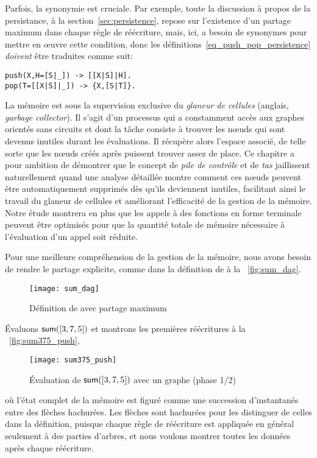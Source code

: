 Parfois, la synonymie est cruciale. Par exemple, toute la discussion à
propos de la persistance, à la section~\ref{sec:persistence}, repose
sur l'existence d'un partage maximum dans chaque règle de réécriture,
mais, ici, \Erlang a besoin de synonymes pour mettre en {\oe}uvre
cette condition, donc les définitions~\eqref{eq_push_pop_persistence}
 \emph{doivent} être traduites comme
suit:
\begin{verbatim}
push(X,H=[S|_]) -> [[X|S]|H].
pop(T=[[X|S]|_]) -> {X,[S|T]}.
\end{verbatim}


La mémoire est sous la supervision exclusive du
\emph{glaneur de cellules} (anglais, \emph{garbage collector}). Il
s'agit d'un processus qui a constamment accès aux graphes orientés
sans circuits et dont la tâche consiste à trouver les n{\oe}uds qui
sont devenus inutiles durant les évaluations. Il récupère alors
l'espace associé, de telle sorte que les n{\oe}uds créés après
puissent trouver assez de place. Ce chapitre a pour ambition de
démontrer que le concept de \emph{pile de contrôle} et de \emph{tas}
jaillissent naturellement quand une analyse détaillée montre comment
ces n{\oe}uds peuvent être automatiquement supprimés dès qu'ils
deviennent inutiles, facilitant ainsi le travail du glaneur de
cellules et améliorant l'efficacité de la gestion de la mémoire. Notre
étude montrera en plus que les appels à des fonctions en forme
terminale peuvent être optimisés pour que la quantité totale de mémoire nécessaire à
l'évaluation d'un appel soit réduite.

Pour une meilleure compréhension de la gestion de la mémoire, nous
avons besoin de rendre le partage explicite, comme dans la définition
de  à la \fig~\vref{fig:sum_dag}.
\begin{figure}
\centering
\texttt{[image: sum\_dag]}%
\caption{Définition de  avec partage maximum
\label{fig:sum_dag}}
\end{figure}
Évaluons \(\textsf{sum}([3,7,5])\) et montrons les premières réécritures
à la \fig~\vref{fig:sum375_push},
\begin{figure}[b]
\centering
\texttt{[image: sum375\_push]}
\caption{Évaluation de \(\textsf{sum}([3,7,5])\) avec un graphe (phase 1/2)
\label{fig:sum375_push}}
\end{figure}
où l'état complet de la mémoire est figuré comme une succession
d'instantanés entre des flèches hachurées.  Les flèches sont hachurées pour les distinguer de celles
dans la définition, puisque chaque règle de réécriture est appliquée
en général seulement à des parties d'arbres, et nous voulons montrer
toutes les données après chaque réécriture.

